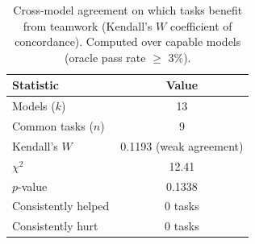 \begin{table}[t]
\centering
\caption{Cross-model agreement on which tasks benefit from teamwork (Kendall's $W$ coefficient of concordance). Computed over capable models (oracle pass rate $\geq$ 3\%).}
\label{tab:kendalls_w}
\begin{tabular}{lc}
\toprule
Statistic & Value \\
\midrule
  Models ($k$) & 13 \\
  Common tasks ($n$) & 9 \\
  Kendall's $W$ & 0.1193 (weak agreement) \\
  $\chi^2$ & 12.41 \\
  $p$-value & 0.1338 \\
  Consistently helped & 0 tasks \\
  Consistently hurt & 0 tasks \\
\bottomrule
\end{tabular}
\end{table}